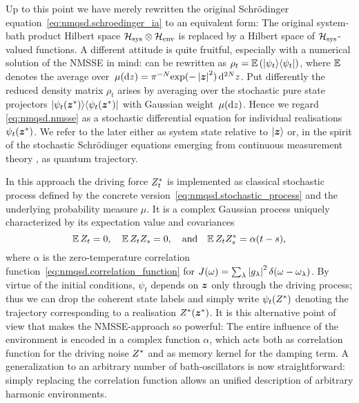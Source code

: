 Up to this point we have merely rewritten the original Schrödinger equation~\ref{eq:nmqsd.schroedinger_ia} to an equivalent form:
The original system-bath product Hilbert space $\mathcal{H}_\mathrm{sys} \otimes \mathcal{H}_\mathrm{env}$ is replaced by a Hilbert space of $\mathcal{H}_\mathrm{sys}$-valued functions.
A different attitude is quite fruitful, especially with a numerical solution of the NMSSE in mind:
 can be rewritten as $\rho_t = \E[\ket{\psi_t}\bra{\psi_t}]$, where $\E$ denotes the average over $\mudz = \pi^{-N} \exp(-\abs{\vec z}^2) \dd^{2N}z$.
Put differently the reduced density matrix $\rho_t$ arises by averaging over the stochastic pure state projectors $| \psi_t({\boldsymbol{z}}^*) \rangle\langle \psi_t({\boldsymbol{z}}^*) |$ with Gaussian weight $\, \mu(\mathrm{d} z)$.
Hence we regard \autoref{eq:nmqsd.nmsse} as a stochastic differential equation for individual realisations $\psi_t({\boldsymbol{z}}^*)$.
We refer to the later either as system state relative to $| \boldsymbol{z} \rangle$ or, in the spirit of the stochastic Schrödinger equations emerging from continuous measurement theory \cite{Ca93_quantum_optics}, as quantum trajectory.

In this approach the driving force ${Z}^*_t$ is implemented as classical stochastic process defined by the concrete version~\ref{eq:nmqsd.stochastic_process} and the underlying probability measure $\mu$.
It is a complex Gaussian process uniquely characterized by its expectation value and covariances
\begin{equation}
  \E\,Z_t = 0, \quad \E\,Z_t Z_s =0, \quad\mbox{and}\quad \E\,Z_t \ZZ_s = \alpha(t-s),
  \label{eq:nmqsd.process_properties}
\end{equation}
where $\alpha$ is the zero-temperature correlation function~\ref{eq:nmqsd.correlation_function} for $J(\omega) = \sum_\lambda \left\vert g_\lambda \right\vert^2 \delta(\omega - \omega_\lambda)$.
By virtue of the initial conditions, $\psi_t$ depends on $\boldsymbol{z}$ only through the driving process; thus we can drop the coherent state labels and simply write $\psi_t({Z}^*)$ denoting the trajectory corresponding to a realisation ${Z}^*({\boldsymbol{z}}^*)$.
It is this alternative point of view that makes the NMSSE-approach so powerful:
The entire influence of the environment is encoded in a complex function $\alpha$, which acts both as correlation function for the driving noise ${Z}^*$ and as memory kernel for the damping term.
A generalization to an arbitrary number of bath-oscillators is now straightforward: simply replacing the correlation function allows an unified description of arbitrary harmonic environments.

